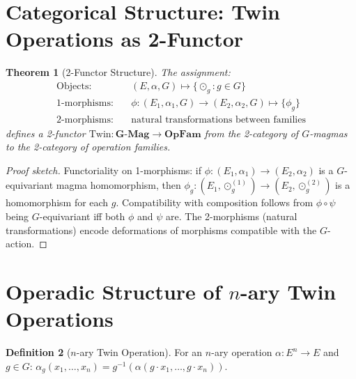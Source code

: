 \documentclass[11pt,twocolumn]{article}
\theoremstyle{plain}\newtheorem{theorem}{Theorem}\newtheorem{proposition}[theorem]{Proposition}\newtheorem{corollary}[theorem]{Corollary}\newtheorem{lemma}[theorem]{Lemma}
\theoremstyle{definition}\newtheorem{definition}[theorem]{Definition}\newtheorem{example}[theorem]{Example}
\theoremstyle{remark}\newtheorem{remark}[theorem]{Remark}
\begin{document}
\section{Categorical Structure: Twin Operations as 2-Functor}
\label{sec:categorical}

\begin{theorem}[2-Functor Structure]\label{thm:2functor}
The assignment:
\begin{align}
\text{Objects:}&\quad (E, \alpha, G) \mapsto \{\odot_g : g \in G\} \\
\text{1-morphisms:}&\quad \phi: (E_1, \alpha_1, G) \to (E_2, \alpha_2, G) \mapsto \{\phi_g\} \\
\text{2-morphisms:}&\quad \text{natural transformations between families}
\end{align}
defines a 2-functor $\mathrm{Twin}: \mathbf{G\text{-}Mag} \to \mathbf{OpFam}$ from the 2-category of $G$-magmas to the 2-category of operation families.
\end{theorem}

\begin{proof}[Proof sketch]
Functoriality on 1-morphisms: if $\phi: (E_1, \alpha_1) \to (E_2, \alpha_2)$ is a $G$-equivariant magma homomorphism, then $\phi_g: (E_1, \odot_g^{(1)}) \to (E_2, \odot_g^{(2)})$ is a homomorphism for each $g$. Compatibility with composition follows from $\phi \circ \psi$ being $G$-equivariant iff both $\phi$ and $\psi$ are. The 2-morphisms (natural transformations) encode deformations of morphisms compatible with the $G$-action.
\end{proof}


\section{Operadic Structure of $n$-ary Twin Operations}
\label{sec:operads}

\begin{definition}[$n$-ary Twin Operation]\label{def:nary}
For an $n$-ary operation $\alpha: E^n \to E$ and $g \in G$:
$\alpha_g(x_1, \ldots, x_n) = g^{-1}(\alpha(g \cdot x_1, \ldots, g \cdot x_n))$.
\end{definition}
\end{document}

